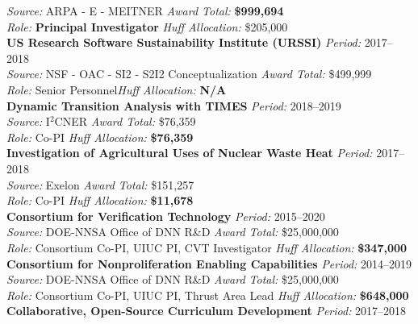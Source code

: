 \documentclass[margin,line]{resume}
\begin{document}
\begin{resume}
    \textsl{Source:} ARPA - E - MEITNER \hfill \textsl{Award Total:} \textbf{\$999,694}\\
    \textsl{Role:} \textbf{Principal Investigator} \hfill \textsl{Huff Allocation:} \$205,000\vspace{2mm}\\%
    \textbf{US Research Software Sustainability Institute (URSSI)} \hfill \textsl{Period:}
    2017--2018\\
    \textsl{Source:} NSF - OAC - SI2 - S2I2 Conceptualization \hfill \textsl{Award Total:} \$499,999\\
    \textsl{Role:} Senior Personnel\hfill \textsl{Huff Allocation:} \textbf{N/A}\vspace{2mm}\\%
    \textbf{Dynamic Transition Analysis with TIMES} \hfill \textsl{Period:}
    2018--2019\\
    \textsl{Source:} I$^2$CNER \hfill \textsl{Award Total:} \$76,359\\
    \textsl{Role:} Co-PI \hfill \textsl{Huff Allocation:} \textbf{\$76,359}\vspace{2mm}\\%
    \textbf{Investigation of Agricultural Uses of Nuclear Waste Heat} \hfill \textsl{Period:} 2017--2018\\
    \textsl{Source:} Exelon \hfill \textsl{Award Total:} \$151,257\\
    \textsl{Role:} Co-PI \hfill \textsl{Huff Allocation:} \textbf{\$11,678}\vspace{2mm}\\%
    \textbf{Consortium for Verification Technology} \hfill \textsl{Period:} 2015--2020\\
    \textsl{Source:} DOE-NNSA Office of DNN R\&D \hfill \textsl{Award Total:} \$25,000,000\\
    \textsl{Role:} Consortium Co-PI, UIUC PI, CVT Investigator  \hfill \textsl{Huff Allocation:} \textbf{\$347,000}\vspace{2mm}\\%
    \textbf{Consortium for Nonproliferation Enabling Capabilities} \hfill \textsl{Period:} 2014--2019\\
    \textsl{Source:} DOE-NNSA Office of DNN R\&D \hfill \textsl{Award Total:} \$25,000,000\\
    \textsl{Role:} Consortium Co-PI, UIUC PI, Thrust Area Lead  \hfill \textsl{Huff Allocation:} \textbf{\$648,000}\vspace{2mm}\\%
    \textbf{Collaborative, Open-Source Curriculum Development} \hfill \textsl{Period:} 2017--2018\\

\end{resume}
\end{document}
